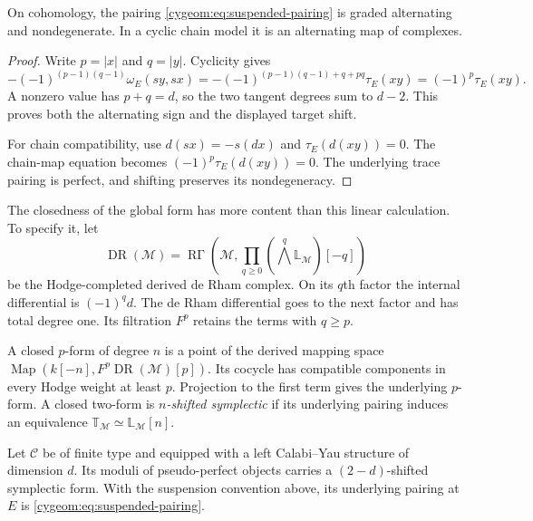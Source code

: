 \begin{lemma}\label{cygeom:lem:shifted-pairing}
On cohomology, the pairing \eqref{cygeom:eq:suspended-pairing} is graded
alternating and nondegenerate. In a cyclic chain model it is an
alternating map of complexes.
\end{lemma}

\begin{proof}
Write $p=|x|$ and $q=|y|$. Cyclicity gives
\[
 -(-1)^{(p-1)(q-1)}\omega_E(sy,sx)
 =-(-1)^{(p-1)(q-1)+q+pq}\tau_E(xy)
 =(-1)^p\tau_E(xy).
\]
A nonzero value has $p+q=d$, so the two tangent degrees sum to $d-2$.
This proves both the alternating sign and the displayed target shift.

For chain compatibility, use $d(sx)=-s(dx)$ and $\tau_E(d(xy))=0$.
The chain-map equation becomes $(-1)^p\tau_E(d(xy))=0$.
The underlying trace pairing is perfect, and shifting preserves its
nondegeneracy.
\end{proof}

The closedness of the global form has more content than this linear
calculation. To specify it, let
\[
 \operatorname{DR}(\mathcal M)
 =\operatorname{R\Gamma}\!\left(
 \mathcal M,\prod_{q\geq0}(\textstyle\bigwedge^q\mathbb L_{\mathcal M})[-q]
 \right)
\]
be the Hodge-completed derived de Rham complex. On its $q$th factor
the internal differential is $(-1)^q d$. The de Rham differential
goes to the next factor and has total degree one.
Its filtration $F^p$ retains the terms with $q\geq p$.

A closed $p$-form of degree $n$ is a point of the derived mapping space
$\operatorname{Map}(k[-n],F^p\operatorname{DR}(\mathcal M)[p])$.
Its cocycle has compatible components in every Hodge weight at least $p$.
Projection to the first term gives the underlying $p$-form. A closed
two-form is \emph{$n$-shifted symplectic} if its underlying pairing
induces an equivalence
$\mathbb T_{\mathcal M}\simeq\mathbb L_{\mathcal M}[n]$.

\begin{theorem}\label{cygeom:thm:moduli-form}
Let $\mathcal C$ be of finite type and equipped with a left
Calabi--Yau structure of dimension $d$. Its moduli of pseudo-perfect
objects carries a $(2-d)$-shifted symplectic form. With the suspension
convention above, its underlying pairing at $E$ is
\eqref{cygeom:eq:suspended-pairing}.
\end{theorem}

